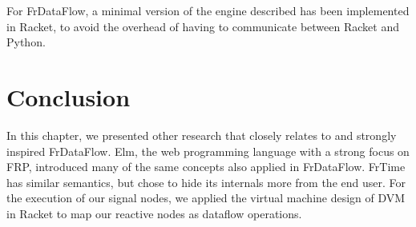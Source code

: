 For FrDataFlow, a minimal version of the engine described has been implemented in Racket, to avoid the overhead of having to communicate between Racket and Python. 

\section{Conclusion}

In this chapter, we presented other research that closely relates to and strongly inspired FrDataFlow. Elm, the web programming language with a strong focus on FRP, introduced many of the same concepts also applied in FrDataFlow. FrTime has similar semantics, but chose to hide its internals more from the end user. For the execution of our signal nodes, we applied the virtual machine design of DVM in Racket to map our reactive nodes as dataflow operations. 





